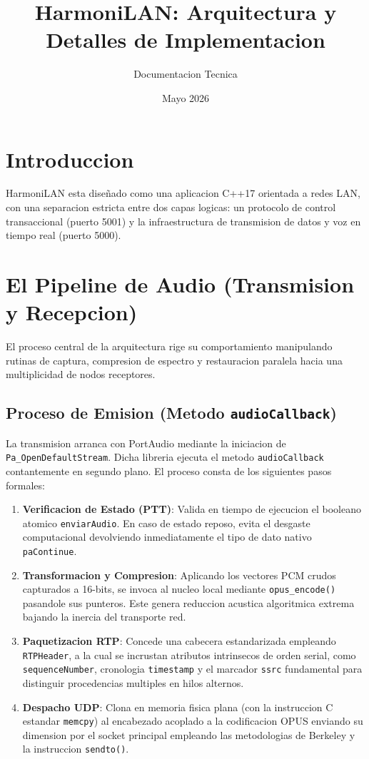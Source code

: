 \documentclass{article}
\title{\textbf{HarmoniLAN: Arquitectura y Detalles de Implementacion}}
\author{Documentacion Tecnica}
\date{Mayo 2026}
\begin{document}
\maketitle

\section{Introduccion}
HarmoniLAN esta diseñado como una aplicacion C++17 orientada a redes LAN, con una separacion estricta entre dos capas logicas: un protocolo de control transaccional (puerto 5001) y la infraestructura de transmision de datos y voz en tiempo real (puerto 5000).

\section{El Pipeline de Audio (Transmision y Recepcion)}
El proceso central de la arquitectura rige su comportamiento manipulando rutinas de captura, compresion de espectro y restauracion paralela hacia una multiplicidad de nodos receptores.

\subsection{Proceso de Emision (Metodo \texttt{audioCallback})}
La transmision arranca con PortAudio mediante la iniciacion de \texttt{Pa\_OpenDefaultStream}. Dicha libreria ejecuta el metodo \texttt{audioCallback} contantemente en segundo plano. El proceso consta de los siguientes pasos formales:
\begin{enumerate}
    \item \textbf{Verificacion de Estado (PTT)}: Valida en tiempo de ejecucion el booleano atomico \texttt{enviarAudio}. En caso de estado reposo, evita el desgaste computacional devolviendo inmediatamente el tipo de dato nativo \texttt{paContinue}.
    \item \textbf{Transformacion y Compresion}: Aplicando los vectores PCM crudos capturados a 16-bits, se invoca al nucleo local mediante \texttt{opus\_encode()} pasandole sus punteros. Este genera reduccion acustica algoritmica extrema bajando la inercia del transporte red.
    \item \textbf{Paquetizacion RTP}: Concede una cabecera estandarizada empleando \texttt{RTPHeader}, a la cual se incrustan atributos intrinsecos de orden serial, como \texttt{sequenceNumber}, cronologia \texttt{timestamp} y el marcador \texttt{ssrc} fundamental para distinguir procedencias multiples en hilos alternos.
    \item \textbf{Despacho UDP}: Clona en memoria fisica plana (con la instruccion C estandar \texttt{memcpy}) al encabezado acoplado a la codificacion OPUS enviando su dimension por el socket principal empleando las metodologias de Berkeley y la instruccion \texttt{sendto()}.
\end{enumerate}
\end{document}
